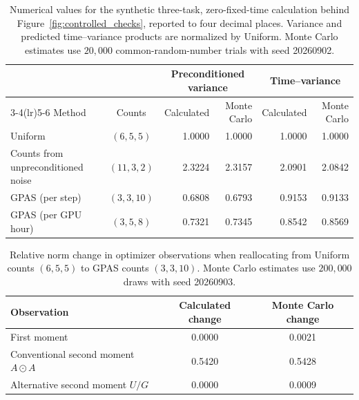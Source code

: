 \begin{table}[H]
\centering
\small
\caption{Numerical values for the synthetic three-task, zero-fixed-time
calculation behind Figure~\ref{fig:controlled_checks}, reported to four decimal
places. Variance and predicted time--variance products are normalized by
Uniform. Monte Carlo estimates use $20{,}000$ common-random-number trials with
seed 20260902.}
\label{tab:controlled_allocation_values}
\setlength{\tabcolsep}{4.5pt}
\begin{tabular}{lcrrrr}
\toprule
& & \multicolumn{2}{c}{Preconditioned variance} &
\multicolumn{2}{c}{Time--variance} \\
\cmidrule(lr){3-4}\cmidrule(lr){5-6}
Method & Counts & Calculated & Monte Carlo & Calculated & Monte Carlo \\
\midrule
Uniform   & $(6,5,5)$  & 1.0000 & 1.0000 & 1.0000 & 1.0000 \\
Counts from unpreconditioned noise & $(11,3,2)$ & 2.3224 & 2.3157 & 2.0901 & 2.0842 \\
GPAS (per step)         & $(3,3,10)$ & 0.6808 & 0.6793 & 0.9153 & 0.9133 \\
GPAS (per GPU hour)     & $(3,5,8)$  & 0.7321 & 0.7345 & 0.8542 & 0.8569 \\
\bottomrule
\end{tabular}
\end{table}

\begin{table}[H]
\centering
\small
\caption{Relative norm change in optimizer observations when reallocating
from Uniform counts $(6,5,5)$ to GPAS counts $(3,3,10)$. Monte Carlo
estimates use $200{,}000$ draws with seed 20260903.}
\label{tab:controlled_moment_values}
\setlength{\tabcolsep}{7pt}
\begin{tabular}{lcc}
\toprule
Observation & Calculated change & Monte Carlo change \\
\midrule
First moment & 0.0000 & 0.0021 \\
Conventional second moment $A\odot A$ & 0.5420 & 0.5428 \\
Alternative second moment $U/G$ & 0.0000 & 0.0009 \\
\bottomrule
\end{tabular}
\end{table}
